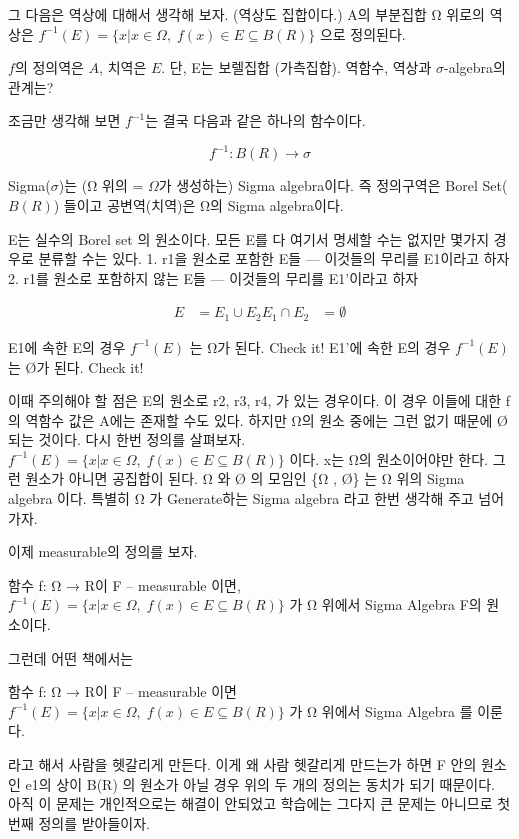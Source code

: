 \documentclass[
]{book}
\begin{document}
{{{그 다음은 역상에 대해서 생각해 보자. (역상도 집합이다.) A의 부분집합 Ω 위로의 역상은 \(f^{-1} (E) = \{ x | x \in \Omega, \; f(x) \in E \subseteq B(R)\}\) 으로 정의된다.

\(f\)의 정의역은 \(A\), 치역은 \(E\). 단, E는 보렐집합 (가측집합).
역함수, 역상과 \(\sigma\)-algebra의 관계는?

조금만 생각해 보면 \(f^{-1}\)는 결국 다음과 같은 하나의 함수이다.

\[
f^{-1} : B(R) \rightarrow \sigma
\]

Sigma(\(\sigma\))는 (Ω 위의 = \(\Omega\)가 생성하는) Sigma algebra이다. 즉 정의구역은 Borel Set(\(B(R)\)) 들이고 공변역(치역)은 Ω의 Sigma algebra이다.

E는 실수의 Borel set 의 원소이다. 모든 E를 다 여기서 명세할 수는 없지만 몇가지 경우로 분류할 수는 있다.
1. r1을 원소로 포함한 E들 --- 이것들의 무리를 E1이라고 하자
2. r1를 원소로 포함하지 않는 E들 --- 이것들의 무리를 E1'이라고 하자

\[
\begin{align}
E &= E_1 \cup E_2
E_1 \cap E_2 &= \emptyset
\end{align}
\]

E1에 속한 E의 경우 \(f^{-1}(E)\) 는 Ω가 된다. Check it!
E1'에 속한 E의 경우 \(f^{-1}(E)\) 는 Ø가 된다. Check it!

이때 주의해야 할 점은 E의 원소로 r2, r3, r4, 가 있는 경우이다. 이 경우 이들에 대한 f의 역함수 값은 A에는 존재할 수도 있다. 하지만 Ω의 원소 중에는 그런 없기 때문에 Ø 되는 것이다. 다시 한번 정의를 살펴보자.
\(f^{-1} (E) = \{ x | x \in \Omega, \; f(x) \in E \subseteq B(R)\}\) 이다. x는 Ω의 원소이어야만 한다. 그런 원소가 아니면 공집합이 된다.
Ω 와 Ø 의 모임인 \{Ω , Ø\} 는 Ω 위의 Sigma algebra 이다. 특별히 Ω 가 Generate하는 Sigma algebra 라고 한번 생각해 주고 넘어가자.

이제 measurable의 정의를 보자.

함수 f: Ω → R이 F -- measurable 이면, \(f^{-1} (E) = \{ x | x \in \Omega, \; f(x) \in E \subseteq B(R)\}\) 가 Ω 위에서 Sigma Algebra F의 원소이다.

그런데 어떤 책에서는

함수 f: Ω → R이 F -- measurable 이면 \(f^{-1} (E) = \{ x | x \in \Omega, \; f(x) \in E \subseteq B(R)\}\) 가 Ω 위에서 Sigma Algebra 를 이룬다.

라고 해서 사람을 헷갈리게 만든다. 이게 왜 사람 헷갈리게 만드는가 하면 F 안의 원소인 e1의 상이 B(R) 의 원소가 아닐 경우 위의 두 개의 정의는 동치가 되기 때문이다.
아직 이 문제는 개인적으로는 해결이 안되었고 학습에는 그다지 큰 문제는 아니므로 첫 번째 정의를 받아들이자.

}}}
\end{document}
